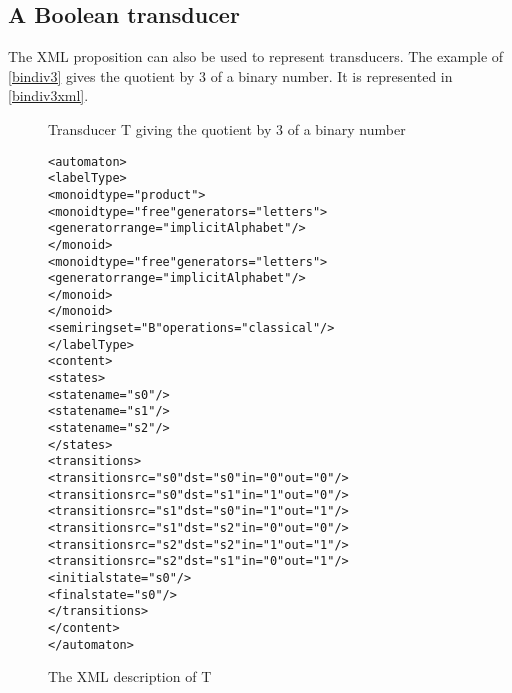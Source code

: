 \documentclass[a4paper]{article}
\begin{document}
\subsection{A Boolean transducer}

The XML proposition can also be used to represent transducers. The example of
\autoref{bindiv3} gives the quotient by 3 of a binary number. It is
represented in \autoref{bindiv3xml}.


\begin{figure}[ht]
  \begin{center}
\caption{Transducer T giving the quotient by 3 of a binary number}
\label{bindiv3}
  \end{center}
\end{figure}

\small
\begin{figure}[ht]
  \begin{center}
\begin{alltt}
<automaton>
  <labelType>
    <monoid type="product">
       <monoid type="free" generators="letters">
         <generator range="implicitAlphabet"/>
       </monoid>
       <monoid type="free" generators="letters">
         <generator range="implicitAlphabet"/>
       </monoid>
    </monoid>
    <semiring set="B" operations="classical"/>
  </labelType>
  <content>
    <states>
       <state name="s0"/>
       <state name="s1"/>
       <state name="s2"/>
    </states>
    <transitions>
       <transition src="s0" dst="s0" in="0" out="0"/>
       <transition src="s0" dst="s1" in="1" out="0"/>
       <transition src="s1" dst="s0" in="1" out="1"/>
       <transition src="s1" dst="s2" in="0" out="0"/>
       <transition src="s2" dst="s2" in="1" out="1"/>
       <transition src="s2" dst="s1" in="0" out="1"/>
       <initial state="s0"/>
       <final state="s0"/>
    </transitions>
  </content>
</automaton>
\end{alltt}

\caption{The XML description of T}
\label{bindiv3xml}
  \end{center}
\end{figure}
\end{document}
